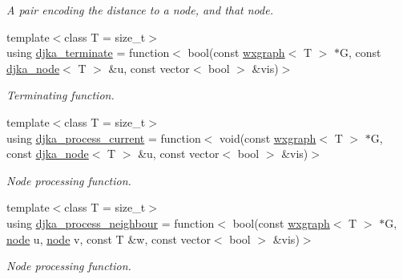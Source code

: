 \begin{DoxyCompactItemize}
\begin{DoxyCompactList}\small\item\em A pair encoding the distance to a node, and that node. \end{DoxyCompactList}\item 
{\footnotesize template$<$class T  = size\+\_\+t$>$ }\\using \hyperlink{namespacelgraph_1_1traversal_1_1dijkstra_a275e9ff05e4d3199245b9642cc88fc74}{djka\+\_\+terminate} = function$<$ bool(const \hyperlink{classlgraph_1_1utils_1_1wxgraph}{wxgraph}$<$ T $>$ $\ast$G, const \hyperlink{namespacelgraph_1_1traversal_1_1dijkstra_a06495bda19735564a02a6e98198a0980}{djka\+\_\+node}$<$ T $>$ \&u, const vector$<$ bool $>$ \&vis)$>$
\begin{DoxyCompactList}\small\item\em Terminating function. \end{DoxyCompactList}\item 
{\footnotesize template$<$class T  = size\+\_\+t$>$ }\\using \hyperlink{namespacelgraph_1_1traversal_1_1dijkstra_a1b15b8b987d2eea35dd01676ba1d3b35}{djka\+\_\+process\+\_\+current} = function$<$ void(const \hyperlink{classlgraph_1_1utils_1_1wxgraph}{wxgraph}$<$ T $>$ $\ast$G, const \hyperlink{namespacelgraph_1_1traversal_1_1dijkstra_a06495bda19735564a02a6e98198a0980}{djka\+\_\+node}$<$ T $>$ \&u, const vector$<$ bool $>$ \&vis)$>$
\begin{DoxyCompactList}\small\item\em Node processing function. \end{DoxyCompactList}\item 
{\footnotesize template$<$class T  = size\+\_\+t$>$ }\\using \hyperlink{namespacelgraph_1_1traversal_1_1dijkstra_abd266610f7bab0d52a202238ca539d38}{djka\+\_\+process\+\_\+neighbour} = function$<$ bool(const \hyperlink{classlgraph_1_1utils_1_1wxgraph}{wxgraph}$<$ T $>$ $\ast$G, \hyperlink{namespacelgraph_1_1utils_ab9c6b34241f0b68372c55f34c460e863}{node} u, \hyperlink{namespacelgraph_1_1utils_ab9c6b34241f0b68372c55f34c460e863}{node} v, const T \&w, const vector$<$ bool $>$ \&vis)$>$
\begin{DoxyCompactList}\small\item\em Node processing function. \end{DoxyCompactList}\end{DoxyCompactItemize}
